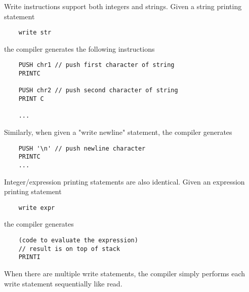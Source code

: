 \documentclass{article}
\begin{document}
\noindent
Write instructions support both integers and strings.
\newline
\newline
Given a string printing statement
\begin{lstlisting}
    write str
\end{lstlisting}
the compiler generates the following instructions
\begin{lstlisting}
    PUSH chr1 // push first character of string
    PRINTC
    
    PUSH chr2 // push second character of string
    PRINT C
    
    ...
\end{lstlisting}

\noindent
Similarly, when given a "write newline" statement, the compiler generates
\begin{lstlisting}
    PUSH '\n' // push newline character
    PRINTC
    ...
\end{lstlisting}

\noindent
Integer/expression printing statements are also identical.
\newline
Given an expression printing statement
\begin{lstlisting}
    write expr
\end{lstlisting}
the compiler generates
\begin{lstlisting}
    (code to evaluate the expression)
    // result is on top of stack
    PRINTI
\end{lstlisting}

\noindent
When there are multiple write statements, the compiler simply performs each write statement sequentially like read.
\end{document}
